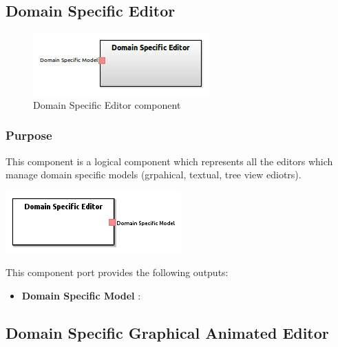 \documentclass{gemoc} %
\begin{document}
\subsection{Domain Specific Editor}

\begin{figure}[htp]
	\begin{center}
	\includegraphics*[trim=0.0cm 0.0cm 0cm 0.0cm, clip=true, scale=1.0]{../images/generated/Generated_Domain Specific Editor.jpg}
	\caption{Domain Specific Editor component}
	\end{center}
\end{figure}

\subsubsection{Purpose}
This component is a logical component which represents all the editors which manage domain specific models (grpahical, textual, tree view ediotrs).
\begin{center}
\includegraphics*[trim=0.0cm 0.0cm 0cm 0.0cm, clip=true]{../images/generated/Generated_Domain_Specific_Editor.png}
\end{center}


This component port provides the following outputs:
\begin{itemize}
  \item \textbf{Domain Specific Model} :
\end{itemize}

\subsection{Domain Specific Graphical Animated Editor}
\end{document}
